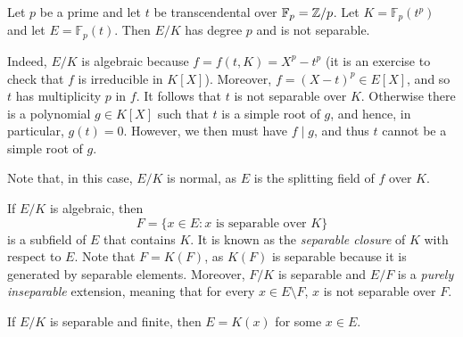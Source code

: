 
\begin{example}
    Let $p$ be a prime and let $t$ be transcendental over $\mathbb{F}_p=\mathbb{Z}/p$. Let $K=\mathbb{F}_p(t^p)$ and let $E=\mathbb{F}_p(t)$. Then $E/K$ has degree $p$ and is not separable.

    Indeed, $E/K$ is algebraic because $f=f(t,K)=X^p-t^p$ (it is an exercise to check that $f$ is irreducible in $K[X]$). Moreover, $f=(X-t)^p \in E[X]$, and so $t$ has multiplicity $p$ in $f$. It follows that $t$ is not separable over $K$. Otherwise there is a polynomial $g \in K[X]$ such that $t$ is a simple root of $g$, and hence, in particular, $g(t)=0$. However, we then must have $f \mid g$, and thus $t$ cannot be a simple root of $g$.

    Note that, in this case, $E/K$ is normal, as $E$ is the splitting field of $f$ over $K$.
\end{example}

\label{separable}
If $E/K$ is algebraic, then 
\[
    F=\{x\in E:x\text{ is separable over }K\}
\]
is a subfield of $E$ that contains $K$. It is known as 
the \emph{separable closure} of $K$ with respect to $E$. 
Note that $F=K(F)$, as
$K(F)$ is separable because it is generated by separable elements. Moreover, 
$F/K$ is separable and 
$E/F$ is a \emph{purely inseparable} extension, meaning that
for every $x\in E\setminus F$, $x$ is not separable over $F$. 

\begin{proposition}
\label{pro:monogenic}
    If $E/K$ is separable and finite, then $E=K(x)$ for some $x\in E$. 
\end{proposition}


